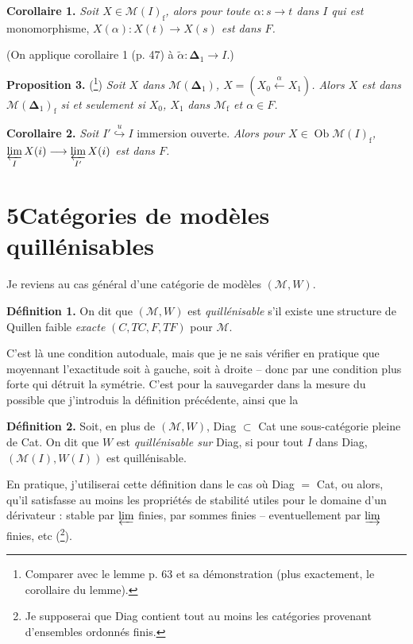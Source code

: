 \documentclass[11pt]{article}
\newcommand{\printedpage}[1]{\marginpar{\footnotesize p.~#1}}
\newcommand{\msp}[1]{\marginpar{\footnotesize [#1]}}
\newcommand{\M}{\mathcal{M}}
\begin{document}
\textbf{Corollaire 1.} \textit{Soit $X \in \M(I)_{\mathrm{f}}$, alors pour toute $\alpha : s \longrightarrow t$ dans $I$ qui est} monomorphisme, \textit{$X(\alpha) : X(t) \longrightarrow X(s)$ est dans $F$.}


\printedpage{29}
(On applique corollaire 1 (p. 47) à $\tilde{\alpha} : \boldsymbol{\Delta}_1 \longrightarrow I$.)

\textbf{Proposition 3.} (\footnote[28]{Comparer avec le lemme p. 63 et sa démonstration (plus exactement, le corollaire du lemme).}) \textit{Soit $X$ dans $\mathcal{M}(\boldsymbol{\Delta}_1)$, $X = (X_0 \xleftarrow{\alpha} X_1)$. Alors $X$ est dans $\mathcal{M}(\boldsymbol{\Delta}_1)_{\mathrm{f}}$ si et seulement si $X_0$, $X_1$} \textit{dans $\mathcal{M}_{\mathrm{f}}$ et $\alpha \in F$.}

\textbf{Corollaire 2.} \textit{Soit $I' \overset{u}{\hookrightarrow} I$} immersion ouverte. \textit{Alors pour $X \in \operatorname{Ob}\mathcal{M}(I)_{\mathrm{f}}$, $\varprojlim\limits_{I} X(i) \longrightarrow \varprojlim\limits_{I'} X(i)$ est dans $F$.}

\section*{5\quad Catégories de modèles quillénisables}

Je reviens au cas général d'une catégorie de modèles $(\mathcal{M},W)$.

\textbf{Définition 1.} On dit que $(\mathcal{M},W)$ est \textit{quillénisable} s'il existe une structure de Quillen faible \textit{exacte} $(C,TC,F,TF)$ pour $\mathcal{M}$.

C'est là une condition autoduale, mais que je ne sais vérifier en pratique que moyennant l'exactitude soit à gauche, soit à droite -- donc par une condition plus forte qui détruit la symétrie. C'est pour la sauvegarder dans la mesure du possible que j'introduis la définition précédente, ainsi que la

\textbf{Définition 2.} Soit, en plus de $(\mathcal{M},W)$, Diag $\subset$ Cat une sous-catégorie pleine de Cat. On dit que
\msp{page 51}$W$ est \textit{quillénisable sur} Diag, si pour tout $I$ dans Diag, $(\mathcal{M}(I),W(I))$ est quillénisable.

En pratique, j'utiliserai cette définition dans le cas où Diag $=$ Cat, ou alors, qu'il satisfasse au moins les propriétés de stabilité utiles pour le domaine d'un dérivateur : stable par $\varprojlim$ finies, par sommes finies -- eventuellement par $\varinjlim$ finies, etc (\footnote[29]{Je supposerai que Diag contient tout au moins les catégories provenant d'ensembles ordonnés finis.}). %
\end{document}
